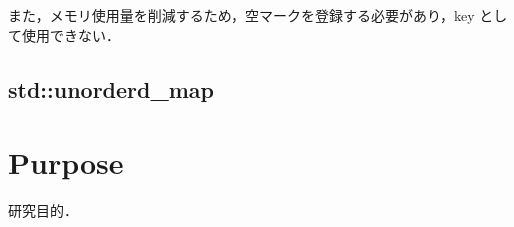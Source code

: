 また，メモリ使用量を削減するため，空マークを登録する必要があり，key として使用できない．

\subsection{std::unorderd\_map}






\section{Purpose}
研究目的．



















